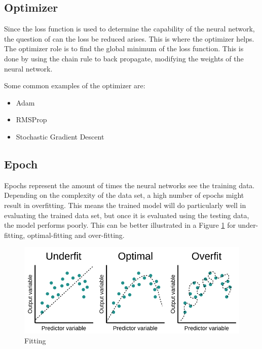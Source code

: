 \documentclass{tum-book}
\begin{document}
        \subsection{Optimizer}
        Since the loss function is used to determine the capability of the neural network, the question of can the loss be reduced arises. This is where the optimizer helps. The optimizer role is to find the global minimum of the loss function. This is done by using the chain rule to back propagate, modifying the weights of the neural network. 
        
            \bigskip\noindent 
            Some common examples of the optimizer are:
            \begin{itemize}
                \item Adam
                \item RMSProp
                \item Stochastic Gradient Descent
            \end{itemize}

        \subsection{Epoch}
        Epochs represent the amount of times the neural networks see the training data. Depending on the complexity of the data set, a high number of epochs might result in overfitting. This means the trained model will do particularly well in evaluating the trained data set, but once it is evaluated using the testing data, the model performs poorly. This can be better illustrated in a Figure \ref{fig:Fitting} for under-fitting, optimal-fitting and over-fitting.
        
            \begin{figure}[h]
                \centering
                \includegraphics[scale=1]{myFiles/myImages/fitting.png}
                \caption{Fitting}
                \label{fig:Fitting}
            \end{figure}
\end{document}
